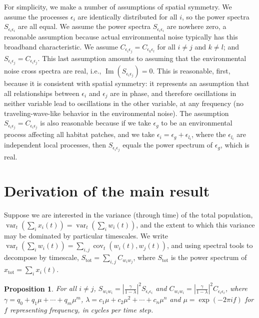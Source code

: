 \documentclass[letterpaper,11pt]{article}
\newcommand{\var}{{\operatorname{var}}}
\newcommand{\cov}{{\operatorname{cov}}}
\newcommand{\Ip}{{\operatorname{Im}}}
\newtheorem{proposition}[theorem]{Proposition}
\begin{document}
For simplicity, we make a number of assumptions of spatial symmetry. We assume 
the processes $\epsilon_i$ are identically distributed  for all
$i$, so the power spectra $S_{\epsilon_{i}\epsilon_{i}}$ are all equal.
We assume 
the power spectra $S_{\epsilon_{i}\epsilon_{i}}$ are nowhere zero, a reasonable
assumption because actual environmental noise typically has this broadband
characteristic. We assume
$C_{\epsilon_{i}\epsilon_{j}}=C_{\epsilon_{k}\epsilon_{l}}$ for all
$i \neq j$ and $k \neq l$; and $S_{\epsilon_{i}\epsilon_{j}}=C_{\epsilon_{i}\epsilon_{j}}$.
This last assumption amounts to assuming that the environmental noise
cross spectra are real, i.e., $\Ip(S_{\epsilon_{i}\epsilon_{j}})=0$.
This is reasonable, first, because it is consistent with spatial symmetry: 
it represents an assumption
that all relationships between $\epsilon_{i}$ and $\epsilon_{j}$
are in phase, and therefore oscillations in neither variable lead to oscillations in the
other variable, at any frequency (no traveling-wave-like behavior 
in the environmental noise).
The assumption $S_{\epsilon_{i}\epsilon_{j}}=C_{\epsilon_{i}\epsilon_{j}}$ 
is also reasonable because if we take $\epsilon_{g}$
to be an environmental process affecting all habitat patches, and we take
$\epsilon_{i}=\epsilon_{g}+\epsilon_{l_i}$, where the $\epsilon_{l_i}$
are independent local processes, then $S_{\epsilon_{i}\epsilon_{j}}$
equals the power spectrum of $\epsilon_{g}$, which is real.

\section{Derivation of the main result}

Suppose we are interested in the variance (through time) of the
total population, $\var_t(\sum_i x_i(t)) = \var_t(\sum_i w_i(t))$,
and the extent to which this variance may be dominated by particular timescales.
We write $\var_t(\sum_i w_i(t))=\sum_{i,j} \cov_t(w_i(t),w_j(t))$,
and using spectral tools to decompose by timescale,
$S_{\text{tot}} = \sum_{i,j} C_{w_i w_j}$, where $S_{\text{tot}}$
is the power spectrum of $x_{\text{tot}} = \sum_i x_i(t)$. 

\begin{proposition}
For all $i \neq j$, $S_{w_i w_i} = \left| \frac{\gamma}{1-\lambda} \right|^2 S_{\epsilon_{i}\epsilon_{i}}$ and $C_{w_i w_i} = \left| \frac{\gamma}{1-\lambda} \right|^2 C_{\epsilon_{i}\epsilon_{i}}$, where $\gamma=q_{ 0}+q_{ 1}\mu+\cdots+q_{m}\mu^{m}$,
$\lambda=c_{ 1 }\mu+c_{ 2}\mu^{2}+\cdots+c_{n}\mu^{n}$ and $\mu=\exp(-2\pi i f)$
for $f$ representing frequency, in cycles per time step.
\end{proposition}
\end{document}
